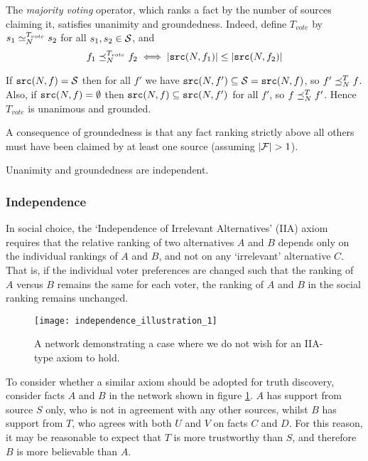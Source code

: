 \documentclass[../main.tex]{subfiles}
\begin{document}
\begin{example}
The \emph{majority voting} operator, which ranks a fact by the number of
sources claiming it, satisfies unanimity and groundedness. Indeed, define
$T_{vote}$ by $s_1 \seq_N^{T_{vote}} s_2$ for all $s_1, s_2 \in \S$, and
    $$ f_1 \fle_N^{T_{vote}} f_2 \iff |\src(N, f_1)| \le |\src(N, f_2)| $$

If $\src(N, f) = \S$ then for all $f'$ we have $\src(N, f') \subseteq \S =
\src(N, f)$, so $f' \fle_N^T f$. Also, if $\src(N, f) = \emptyset$ then
$\src(N, f) \subseteq \src(N, f')$ for all $f'$, so $f \fle_N^T f'$. Hence
$T_{vote}$ is unanimous and grounded.
\end{example}

A consequence of groundedness is that any fact ranking strictly above all
others must have been claimed by at least one source (assuming $|\F|>1$).

\begin{proposition}
\label{prop:unam_ground_indep}
Unanimity and groundedness are independent.
\end{proposition}

\subsubsection{Independence}

In social choice, the `Independence of Irrelevant Alternatives' (IIA) axiom
\cite{arrow} requires that the relative ranking of two alternatives $A$ and $B$
depends only on the individual rankings of $A$ and $B$, and not on any
`irrelevant' alternative $C$. That is, if the individual voter preferences are
changed such that the ranking of $A$ versus $B$ remains the same for each
voter, the ranking of $A$ and $B$ in the social ranking remains unchanged.

\begin{figure}
    \centering
    \texttt{[image: independence\_illustration\_1]}
    \caption{
        A network demonstrating a case where we do not wish for an IIA-type
        axiom to hold.
    }
    \label{img:independence_illustration_1}
\end{figure}

To consider whether a similar axiom should be adopted for truth discovery,
consider facts $A$ and $B$ in the network shown in figure
\ref{img:independence_illustration_1}. $A$ has support from source $S$ only,
who is not in agreement with any other sources, whilst $B$ has support from
$T$, who agrees with both $U$ and $V$ on facts $C$ and $D$. For this reason, it
may be reasonable to expect that $T$ is more trustworthy than $S$, and
therefore $B$ is more believable than $A$.
\end{document}
